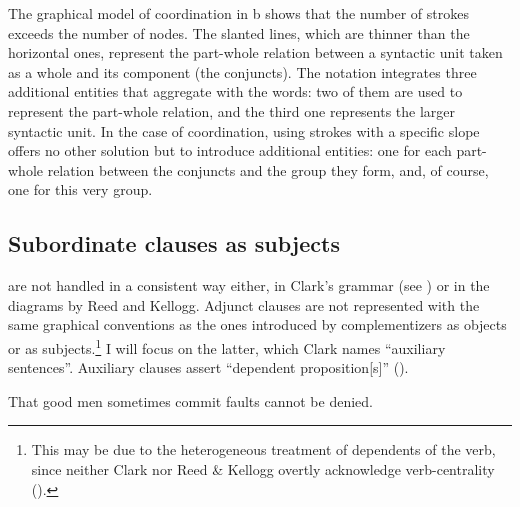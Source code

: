 \documentclass[english,output=paper,colorlinks,citecolor=brown]{../langscibook}
\begin{document}
The graphical model of coordination in b shows that the number of strokes exceeds the number of nodes. The slanted lines, which are thinner than the horizontal ones, represent the part-whole relation between a syntactic unit taken as a whole and its component (the conjuncts). The notation integrates three additional entities that aggregate with the words: two of them are used to represent the part-whole relation, and the third one represents the larger syntactic unit. In the case of coordination, using strokes with a specific slope offers no other solution but to introduce additional entities: one for each part-whole relation between the conjuncts and the group they form, and, of course, one for this very group.

\subsection{Subordinate clauses as subjects}\label{sec:4:4.3}

 are not handled in a consistent way either, in Clark’s grammar  (see \citealt[319--322 and 328--329]{Mazziotta2016}) or in the diagrams by Reed and Kellogg. Adjunct clauses are not represented with the same graphical conventions as the ones introduced by complementizers as objects or as subjects.\footnote{ \textrm{This may be due to the heterogeneous treatment of dependents of the verb, since neither Clark nor Reed \& Kellogg overtly acknowledge verb-centrality ().}} I will focus on the latter, which Clark names “auxiliary sentences”. Auxiliary clauses assert “dependent proposition[s]” (\citeyear[187]{Clark1870}).

\ea \label{ex:4:4} That good men sometimes commit faults cannot be denied. \z
\end{document}
